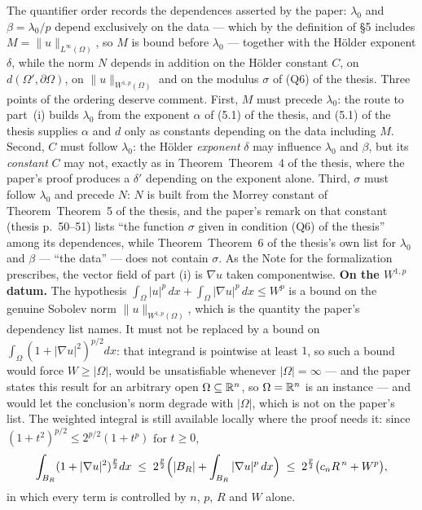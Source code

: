 \begin{theorem}[Theorem 6]
\begin{itemize}
\end{itemize}
The quantifier order records the dependences asserted by the paper: $\lambda_0$
and $\beta=\lambda_0/p$ depend exclusively on the data --- which by the
definition of \S5 includes $M=\|u\|_{L^\infty(\Omega)}$, so $M$ is bound before
$\lambda_0$ --- together with the H\"older exponent $\delta$, while the norm $N$
depends in addition on the H\"older constant $C$, on
$d(\Omega',\partial\Omega)$, on $\|u\|_{W^{1,p}(\Omega)}$ and on the modulus
$\sigma$ of (Q6) of the thesis.  Three points of the ordering deserve comment.  First, $M$ must precede $\lambda_0$: the route to
part~(i) builds $\lambda_0$ from the exponent $\alpha$ of (5.1) of the thesis, and
(5.1) of the thesis supplies $\alpha$ and $d$ only as constants depending on the data
including $M$.  Second, $C$ must follow $\lambda_0$: the H\"older
\emph{exponent} $\delta$ may influence $\lambda_0$ and $\beta$, but its
\emph{constant} $C$ may not, exactly as in Theorem~Theorem~4 of the thesis, where the
paper's proof produces a $\delta'$ depending on the exponent alone.  Third,
$\sigma$ must follow $\lambda_0$ and precede $N$: $N$ is built from the Morrey
constant of Theorem~Theorem~5 of the thesis, and the paper's remark on that constant
(thesis p.~50--51) lists ``the function $\sigma$ given in condition
(Q6) of the thesis'' among its dependences, while Theorem~Theorem~6 of the thesis's own list for
$\lambda_0$ and $\beta$ --- ``the data'' --- does not contain $\sigma$.  As the
Note for the formalization prescribes, the vector field of part (i) is
$\nabla u$ taken componentwise.
\noindent\textbf{On the $W^{1,p}$ datum.}  The hypothesis
$\int_\Omega|u|^p\,dx+\int_\Omega|\nabla u|^p\,dx\le W^p$ is a bound on the
genuine Sobolev norm $\|u\|_{W^{1,p}(\Omega)}$, which is the quantity the
paper's dependency list names.  It must not be replaced by a bound on
$\int_\Omega(1+|\nabla u|^2)^{p/2}dx$: that integrand is pointwise at least $1$,
so such a bound would force $W\ge|\Omega|$, would be unsatisfiable whenever
$|\Omega|=\infty$ --- and the paper states this result for an arbitrary open
$\Omega\subseteq\mathbb{R}^n$, so $\Omega=\mathbb{R}^n$ is an instance --- and would let the
conclusion's norm degrade with $|\Omega|$, which is not on the paper's list.
The weighted integral is still available locally where the proof needs it: since
$(1+t^2)^{p/2}\le2^{p/2}(1+t^p)$ for $t\ge0$,
\[
\int_{B_R}(1+|\nabla u|^2)^{\frac p2}dx
\;\le\;2^{\frac p2}\Bigl(|B_R|+\int_{B_R}|\nabla u|^p\,dx\Bigr)
\;\le\;2^{\frac p2}\bigl(c_nR^{\,n}+W^p\bigr),
\]
in which every term is controlled by $n$, $p$, $R$ and $W$ alone.


\end{theorem}
